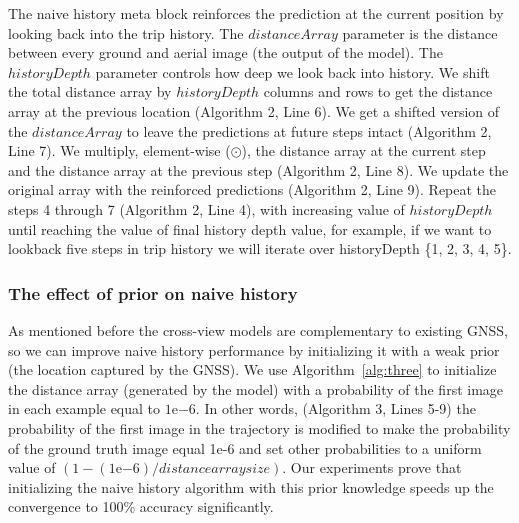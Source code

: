\documentclass[10pt,letterpaper]{article}
\begin{document}
The naive history meta block reinforces the prediction at the current position by looking back into the trip history. The $distanceArray$ parameter is the distance between every ground and aerial image (the output of the model).  The $historyDepth$ parameter controls how deep we look back into history. We shift the total distance array by $historyDepth$ columns and rows to get the distance array at the previous location (Algorithm 2, Line 6). We get a shifted version of the $distanceArray$ to leave the predictions at future steps intact (Algorithm 2, Line 7).  We multiply, element-wise ($\odot$), the distance array at the current step and the distance array at the previous step (Algorithm 2, Line 8). We update the original array with the reinforced predictions (Algorithm 2, Line 9). Repeat the steps 4 through 7 (Algorithm 2, Line 4), with increasing value of $historyDepth$ until reaching the value of final history depth value, for example, if we want to lookback five steps in trip history we will iterate over historyDepth  \{1, 2, 3, 4, 5\}.

\subsubsection*{The effect of prior on naive history}
As mentioned before the cross-view models are complementary to existing GNSS, so we can improve naive history performance by initializing it with a weak prior (the location captured by the GNSS).  We use Algorithm~\ref{alg:three} to initialize the distance array (generated by the model) with a probability of the first image in each example equal to $1\mathrm{e}{-6}$. In other words, (Algorithm 3, Lines 5-9) the probability of the first image in the trajectory is modified to make the probability of the ground truth image equal 1e-6 and set other probabilities to a uniform value of $(1 - (1\mathrm{e}{-6}) / distance array size)$. Our experiments prove that initializing the naive history algorithm with this prior knowledge speeds up the convergence to 100\% accuracy significantly.
\end{document}
